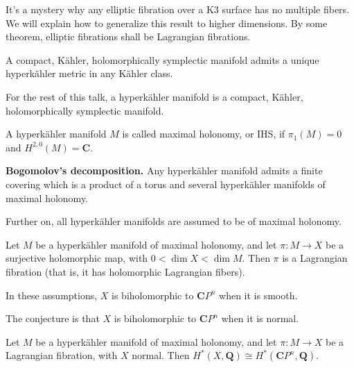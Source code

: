 \medskip\noindent
It's a mystery why any elliptic fibration
over a K3 surface has no multiple fibers.
We will explain how to generalize this result
to higher dimensions. By some
theorem, elliptic fibrations shall
be Lagrangian fibrations.

\medskip\noindent

\begin{theorem}
\label{theorem-calabi-yau}
A compact, K\"ahler, holomorphically
symplectic manifold admits a unique
hyperk\"ahler metric in any K\"ahler class.
\end{theorem}

\begin{definition}
\label{definition-hyperkahler-manifold}
For the rest of this talk, a hyperk\"ahler
manifold is a compact, K\"ahler,
holomorphically symplectic manifold.
\end{definition}

\begin{definition}
\label{definition-maximal-holonomy}
A hyperk\"ahler manifold \(M\) is called
maximal holonomy, or IHS, if
\(\pi_1(M)=0\) and \(H^{2,0}(M)=\mathbf{C}\).
\end{definition}

\medskip\noindent
\textbf{Bogomolov's decomposition.}
Any hyperk\"ahler manifold admits a finite
covering which is a product of a torus and
several hyperk\"ahler manifolds of maximal
holonomy.

\medskip\noindent
Further on, all hyperk\"ahler manifolds are
assumed to be of maximal holonomy.

\begin{theorem}[Matsushita]
\label{theorem-matsushita-lagrangian}
Let \(M\) be a hyperk\"ahler manifold of
maximal holonomy, and let
\(\pi : M \to X\) be a surjective
holomorphic map, with \(0 < \dim X < \dim M\).
Then \(\pi\) is a Lagrangian fibration
(that is, it has holomorphic Lagrangian
fibers).
\end{theorem}

\begin{theorem}[Hwang]
\label{theorem-hwang-smooth-base}
In these assumptions, \(X\) is biholomorphic
to \(\mathbf{C}P^n\) when it is smooth.
\end{theorem}

\medskip\noindent
The conjecture is that \(X\) is biholomorphic
to \(\mathbf{C}P^n\) when it is normal.

\begin{theorem}[Matsushita]
\label{theorem-matsushita-normal-base}
Let \(M\) be a hyperk\"ahler manifold of
maximal holonomy, and let
\(\pi : M \to X\) be a Lagrangian fibration,
with \(X\) normal. Then
\(H^*(X,\mathbf{Q}) \cong H^*(\mathbf{C}P^n,
\mathbf{Q})\).
\end{theorem}


